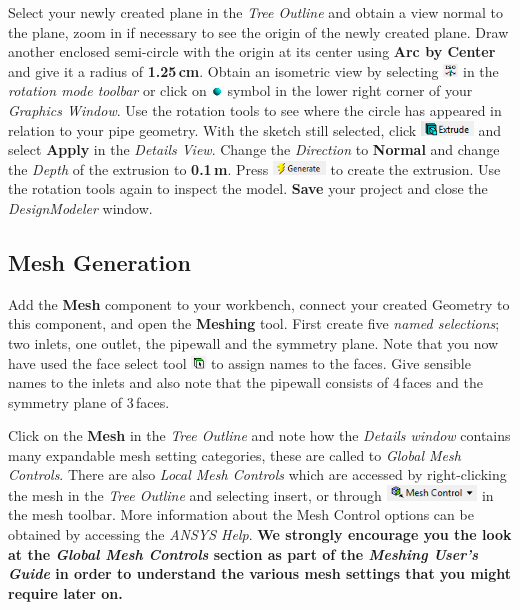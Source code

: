 \documentclass[12pts,a4paper,amsmath,amssymb,floatfix]{article}%
\newcommand\bfr[1]{\textcolor[rgb]{1,0.00,0.00}{\textbf{\textsf{#1}}}}
\begin{document}
Select your newly created plane in the \emph{Tree Outline} and obtain a view normal to the plane, zoom in if necessary to see the origin of the newly created plane. Draw another enclosed semi-circle with the origin at its center using \bfr{Arc by Center} and give it a radius of \bfr{1.25\,cm}. Obtain an isometric view by selecting \includegraphics[width=0.4cm]{./Pics/isometric_view1.png} in the \emph{rotation mode toolbar} or click on \includegraphics[width=0.3cm]{./Pics/isometric_view2.png} symbol in the lower right corner of your \emph{Graphics Window}. Use the rotation tools to see where the circle has appeared in relation to your pipe geometry. With the sketch still selected, click \includegraphics[width=1.4cm]{./Pics/extrude.png} and select \bfr{Apply} in the \emph{Details View}. Change the \emph{Direction} to \bfr{Normal} and change the \emph{Depth} of the extrusion to \bfr{0.1\,m}. Press \includegraphics[width=1.4cm]{./Pics/generate_button.png} to create the extrusion. Use the rotation tools again to inspect the model. \bfr{Save} your project and close the \emph{DesignModeler} window.

\subsection{Mesh Generation}
Add the \bfr{Mesh} component to your workbench, connect your created Geometry to this component, and open the \bfr{Meshing} tool. First create five \emph{named selections}; two inlets, one outlet, the pipewall and the symmetry plane. Note that you now have used the face select tool \includegraphics[width=0.4cm]{./Pics/select_faces.png} to assign names to the faces. Give sensible names to the inlets and also note that the pipewall consists of 4\,faces and the symmetry plane of 3\,faces.

Click on the \bfr{Mesh} in the \emph{Tree Outline} and note how the \emph{Details window} contains many expandable mesh setting categories, these are called to \emph{Global Mesh Controls}. There are also \emph{Local Mesh Controls} which are accessed by right-clicking the mesh in the \emph{Tree Outline} and selecting insert, or through \includegraphics[width=2.4cm]{./Pics/mesh_control.png} in the mesh toolbar. More information about the Mesh Control options can be obtained by accessing the \emph{ANSYS Help}. {\bf We strongly encourage you the look at the \emph{Global Mesh Controls} section as part of the \emph{Meshing User's Guide} in order to understand the various mesh settings that you might require later on.}
\end{document}
